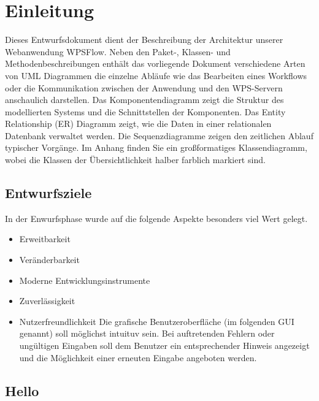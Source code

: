 \chapter{Einleitung}
    Dieses Entwurfsdokument dient der Beschreibung der Architektur unserer Webanwendung WPSFlow.
    Neben den Paket-, Klassen- und Methodenbeschreibungen enthält das vorliegende Dokument verschiedene Arten von UML %
    Diagrammen die einzelne Abläufe wie das Bearbeiten eines Workflows oder die Kommunikation zwischen der Anwendung und den WPS-Servern anschaulich darstellen. \newline
    Das Komponentendiagramm zeigt die Struktur des modellierten Systems und die Schnittstellen der Komponenten. \newline
    Das Entity Relationship (ER) Diagramm zeigt, wie die Daten in einer relationalen Datenbank verwaltet werden.\newline
    Die Sequenzdiagramme zeigen den zeitlichen Ablauf typischer Vorgänge.\newline 
    Im Anhang finden Sie ein großformatiges Klassendiagramm, wobei die Klassen der Übersichtlichkeit halber farblich markiert sind.
    \newline
    \section{Entwurfsziele}
    In der Enwurfsphase wurde auf die folgende Aspekte besonders viel Wert gelegt. 
        \begin{itemize}
            \item Erweitbarkeit
                
            \item Veränderbarkeit
            \item Moderne Entwicklungsinstrumente
            \item Zuverlässigkeit
            \item Nutzerfreundlichkeit \newline
                Die grafische Benutzeroberfläche (im folgenden GUI genannt) soll möglichst intuituv sein. Bei auftretenden Fehlern oder ungültigen Eingaben soll dem Benutzer ein entsprechender Hinweis angezeigt und die Möglichkeit einer erneuten Eingabe angeboten werden.
        \end{itemize}
    \section{Hello}
        \lipsum[20]
        
